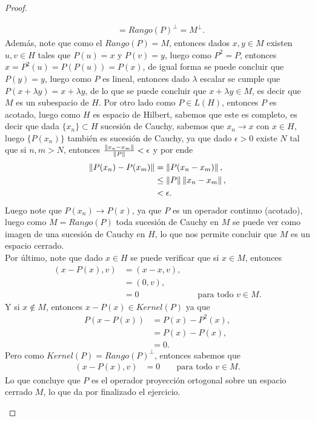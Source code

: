 \begin{proof}
\begin{enumerate}
\begin{align*}
        &=Rango(P)^{\perp}=M^{\perp}.
      \end{align*}
      Además, note que como el $Rango(P)=M$, entonces dados $x,y\in M$ existen $u,v\in H$ tales que $P(u)=x$ y $P(v)=y$, luego como $P^2=P$, entonces $x=P^{2}(u)=P(P(u))=P(x)$, de igual forma se puede concluir que $P(y)=y$, luego como $P$ es lineal, entonces dado $\lambda$ escalar se cumple que $P(x+\lambda y)=x+\lambda y$, de lo que se puede concluir que $x+\lambda y\in M$, es decir que $M$ es un subespacio de $H$. Por otro lado como $P\in L(H)$, entonces $P$ es acotado, luego como $H$ es espacio de Hilbert, sabemos que este es completo, es decir que dada $\{x_{n}\}\subset H$ sucesión de Cauchy, sabemos que $x_{n}\to x$ con $x\in H$, luego $\{P(x_{n})\}$ también es sucesión de Cauchy, ya que dado $\epsilon>0$ existe $N$ tal que si $n,m>N$, entonces $\frac{\left\|x_{n}-x_{m}\right\|}{\left\|P\right\|}<\epsilon$ y por ende 
      \begin{align*}
        \left\|P(x_{n})-P(x_{m})\right\|&=\left\|P(x_{n}-x_{m})\right\|,\\
        &\leq \left\|P\right\|\left\|x_{n}-x_{m}\right\|,\\
        &< \epsilon.
      \end{align*}
      Luego note que $P(x_{n})\to P(x)$, ya que $P$ es un operador continuo (acotado), luego como $M=Rango(P)$ toda sucesión de Cauchy en $M$ se puede ver como imagen de una sucesión de Cauchy en $H$, lo que nos permite concluir que $M$ es un espacio cerrado.\\
      Por último, note que dado $x\in H$ se puede verificar que si $x\in M$, entonces 
      \begin{align*}
        (x-P(x),v)&=(x-x,v),\\
        &=(0,v),\\
        &=0&&\text{ para todo $v\in M$.}
      \end{align*}
      Y si $x\notin M$, entonces $x-P(x)\in Kernel(P)$ ya que
      \begin{align*}
        P(x-P(x))&=P(x)-P^{2}(x),\\
        &=P(x)-P(x),\\
        &=0.
      \end{align*}
      Pero como $Kernel(P)=Rango(P)^{\perp}$, entonces sabemos que
      \begin{align*}
        (x-P(x),v)&=0&&\text{ para todo $v\in M$.}
      \end{align*}
      Lo que concluye que $P$ es el operador proyección ortogonal sobre un espacio cerrado $M$, lo que da por finalizado el ejercicio. 
  \end{enumerate}
\end{proof}
